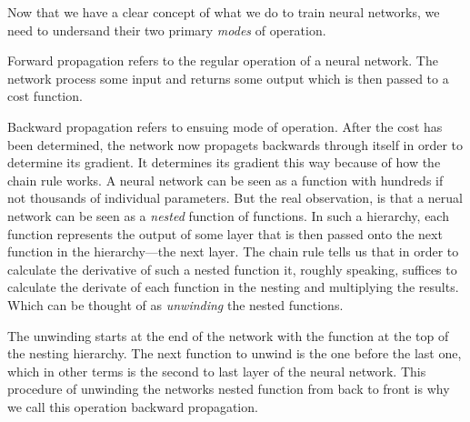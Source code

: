 Now that we have a clear concept of what we do to train neural networks, we need to undersand their two primary {\em modes} of operation.

Forward propagation refers to the regular operation of a neural network.
The network process some input and returns some output which is then passed to a cost function.

Backward propagation refers to ensuing mode of operation.
After the cost has been determined, the network now propagets backwards through itself in order to determine its gradient.
It determines its gradient this way because of how the chain rule works.
A neural network can be seen as a function with hundreds if not thousands of individual parameters.
But the real observation, is that a nerual network can be seen as a {\em nested} function of functions.
In such a hierarchy, each function represents the output of some layer that is then passed onto the next function in the hierarchy---the next layer.
The chain rule tells us that in order to calculate the derivative of such a nested function it, roughly speaking, suffices to calculate the derivate of each function in the nesting and multiplying the results.
Which can be thought of as {\em unwinding} the nested functions.

The unwinding starts at the end of the network with the function at the top of the nesting hierarchy.
The next function to unwind is the one before the last one, which in other terms is the second to last layer of the neural network.
This procedure of unwinding the networks nested function from back to front is why we call this operation backward propagation.

\startplacefigure[
    title={Forward propagation and backward propagation \cite[agarwal_2017].},
    location=bottom,
]
\stopplacefigure